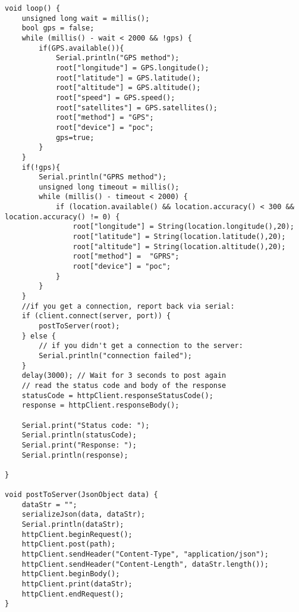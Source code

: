 \begin{lstlisting}
void loop() {
	unsigned long wait = millis();
	bool gps = false;
	while (millis() - wait < 2000 && !gps) {
		if(GPS.available()){
			Serial.println("GPS method");
			root["longitude"] = GPS.longitude();
			root["latitude"] = GPS.latitude();
			root["altitude"] = GPS.altitude();
			root["speed"] = GPS.speed();
			root["satellites"] = GPS.satellites();
			root["method"] = "GPS";
			root["device"] = "poc";
			gps=true;
		}
	}
	if(!gps){
		Serial.println("GPRS method");
		unsigned long timeout = millis();
		while (millis() - timeout < 2000) {
			if (location.available() && location.accuracy() < 300 && location.accuracy() != 0) {
				root["longitude"] = String(location.longitude(),20);
				root["latitude"] = String(location.latitude(),20);
				root["altitude"] = String(location.altitude(),20);
				root["method"] =  "GPRS";
				root["device"] = "poc";
			}
		}
	}
	//if you get a connection, report back via serial:
	if (client.connect(server, port)) {
		postToServer(root);
	} else {
		// if you didn't get a connection to the server:
		Serial.println("connection failed");
	}
	delay(3000); // Wait for 3 seconds to post again
	// read the status code and body of the response
	statusCode = httpClient.responseStatusCode();
	response = httpClient.responseBody();
	
	Serial.print("Status code: ");
	Serial.println(statusCode);
	Serial.print("Response: ");
	Serial.println(response);
	
}

void postToServer(JsonObject data) {
	dataStr = "";
	serializeJson(data, dataStr);
	Serial.println(dataStr);
	httpClient.beginRequest();
	httpClient.post(path);
	httpClient.sendHeader("Content-Type", "application/json");
	httpClient.sendHeader("Content-Length", dataStr.length());
	httpClient.beginBody();
	httpClient.print(dataStr);
	httpClient.endRequest();
}
\end{lstlisting}
